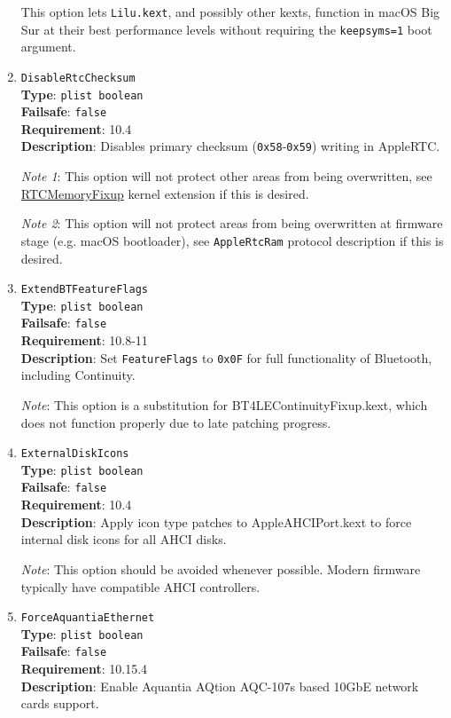 \documentclass[]{article}
\begin{document}
\begin{enumerate}
  This option lets \texttt{Lilu.kext}, and possibly other kexts, function
  in macOS Big Sur at their best performance levels without requiring the
  \texttt{keepsyms=1} boot argument.

\item
  \texttt{DisableRtcChecksum}\\
  \textbf{Type}: \texttt{plist\ boolean}\\
  \textbf{Failsafe}: \texttt{false}\\
  \textbf{Requirement}: 10.4\\
  \textbf{Description}: Disables primary checksum (\texttt{0x58}-\texttt{0x59})
  writing in AppleRTC.

  \emph{Note 1}: This option will not protect other areas from being overwritten,
  see \href{https://github.com/acidanthera/RTCMemoryFixup}{RTCMemoryFixup}
  kernel extension if this is desired.

  \emph{Note 2}: This option will not protect areas from being overwritten
  at firmware stage (e.g. macOS bootloader), see \texttt{AppleRtcRam} protocol
  description if this is desired.

\item
  \texttt{ExtendBTFeatureFlags}\\
  \textbf{Type}: \texttt{plist\ boolean}\\
  \textbf{Failsafe}: \texttt{false}\\
  \textbf{Requirement}: 10.8-11\\
  \textbf{Description}: Set \texttt{FeatureFlags} to \texttt{0x0F} for full
  functionality of Bluetooth, including Continuity.

  \emph{Note}: This option is a substitution for BT4LEContinuityFixup.kext,
  which does not function properly due to late patching progress.

\item
  \texttt{ExternalDiskIcons}\\
  \textbf{Type}: \texttt{plist\ boolean}\\
  \textbf{Failsafe}: \texttt{false}\\
  \textbf{Requirement}: 10.4\\
  \textbf{Description}: Apply icon type patches to AppleAHCIPort.kext to force
  internal disk icons for all AHCI disks.

  \emph{Note}: This option should be avoided whenever possible. Modern firmware
  typically have compatible AHCI controllers.

\item
  \texttt{ForceAquantiaEthernet}\\
  \textbf{Type}: \texttt{plist\ boolean}\\
  \textbf{Failsafe}: \texttt{false}\\
  \textbf{Requirement}: 10.15.4\\
  \textbf{Description}: Enable Aquantia AQtion AQC-107s based 10GbE network cards support.


\end{enumerate}
\end{document}
